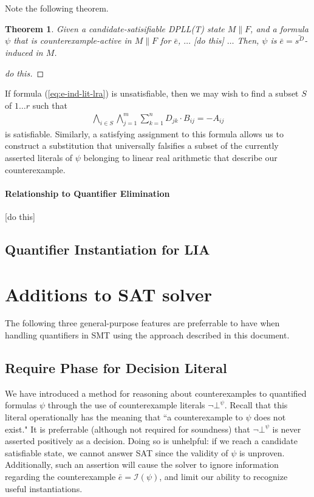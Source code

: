 \documentclass{llncs}
\newtheorem{thm}{Theorem}
\begin{document}
Note the following theorem.

\begin{thm}
Given a candidate-satisifiable DPLL(T) state $M \parallel F$, and a formula $\psi$ that is counterexample-active in $M \parallel F$ for $\bar{e}$,
$\ldots$ [do this] $\ldots$
Then, $\psi$ is $\bar{e} = \bar{s^D}$-induced in $M$.
\end{thm}
\begin{proof}
[do this]
\end{proof}

If formula (\ref{eq:e-ind-lit-lra}) is unsatisfiable, then we may wish to find a subset $S$ of $1 \ldots r$ such that 
\begin{eqnarray}
\displaystyle\bigwedge\limits_{i \in S} \displaystyle\bigwedge\limits_{j=1}^m \displaystyle\sum\limits_{k=1}^n D_{jk} \cdot B_{ij} = -A_{ij}
\end{eqnarray}
is satisfiable.  
Similarly, a satisfying assignment to this formula allows us to construct a substitution that universally falsifies a subset of the currently asserted literals of $\psi$ belonging to linear real arithmetic that describe our counterexample.

\paragraph{Relationship to Quantifier Elimination}

[do this]

\subsection{Quantifier Instantiation for LIA}


\section{Additions to SAT solver}
\label{sec:sat-add}

The following three general-purpose features are preferrable to have when handling quantifiers in SMT using the approach described in this document.

\subsection{Require Phase for Decision Literal}

We have introduced a method for reasoning about counterexamples to quantified formulas $\psi$ through the use of counterexample literals $\neg \bot^\psi$.
Recall that this literal operationally has the meaning that ``a counterexample to $\psi$ does not exist."
It is preferrable (although not required for soundness) that $\neg \bot^\psi$ is never asserted positively as a decision.
Doing so is unhelpful:  if we reach a candidate satisfiable state, we cannot answer SAT since the validity of $\psi$ is unproven.
Additionally, such an assertion will cause the solver to ignore information regarding the counterexample $\bar{e} = \mathcal{I}( \psi )$, and limit our ability to recognize useful instantiations.
\end{document}

